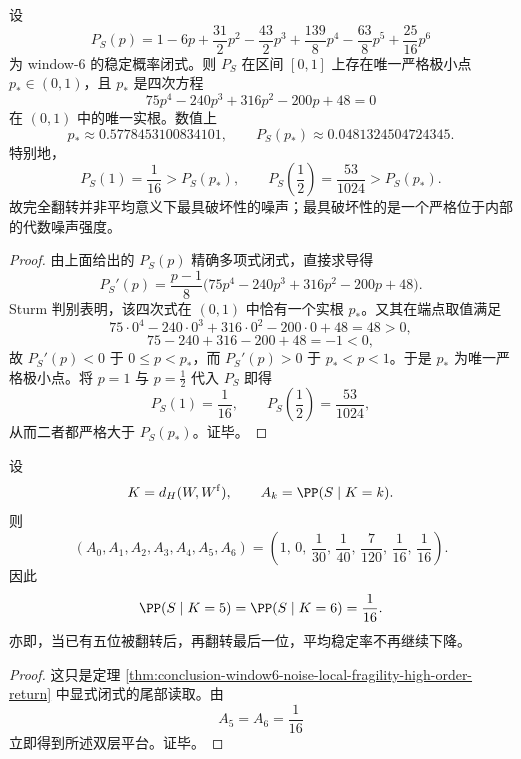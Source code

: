 \begin{theorem}\label{thm:conclusion-window6-stability-probability-unique-internal-minimum}
设
\[
P_S(p)=1-6p+\frac{31}{2}p^2-\frac{43}{2}p^3+\frac{139}{8}p^4-\frac{63}{8}p^5+\frac{25}{16}p^6
\]
为 window-\(6\) 的稳定概率闭式。则 \(P_S\) 在区间 \([0,1]\) 上存在唯一严格极小点 \(p_*\in(0,1)\)，且 \(p_*\) 是四次方程
\[
75p^4-240p^3+316p^2-200p+48=0
\]
在 \((0,1)\) 中的唯一实根。数值上
\[
p_*\approx 0.5778453100834101,
\qquad
P_S(p_*)\approx 0.0481324504724345.
\]
特别地，
\[
P_S(1)=\frac1{16}>P_S(p_*),
\qquad
P_S\!\left(\frac12\right)=\frac{53}{1024}>P_S(p_*).
\]
故完全翻转并非平均意义下最具破坏性的噪声；最具破坏性的是一个严格位于内部的代数噪声强度。
\end{theorem}
\begin{proof}
由上面给出的 \(P_S(p)\) 精确多项式闭式，直接求导得
\[
P_S'(p)
=
\frac{p-1}{8}\bigl(75p^4-240p^3+316p^2-200p+48\bigr).
\]
Sturm 判别表明，该四次式在 \((0,1)\) 中恰有一个实根 \(p_*\)。又其在端点取值满足
\[
75\cdot 0^4-240\cdot 0^3+316\cdot 0^2-200\cdot 0+48=48>0,
\]
\[
75-240+316-200+48=-1<0,
\]
故 \(P_S'(p)<0\) 于 \(0\le p<p_*\)，而 \(P_S'(p)>0\) 于 \(p_*<p<1\)。于是 \(p_*\) 为唯一严格极小点。将 \(p=1\) 与 \(p=\frac12\) 代入 \(P_S\) 即得
\[
P_S(1)=\frac1{16},
\qquad
P_S\!\left(\frac12\right)=\frac{53}{1024},
\]
从而二者都严格大于 \(P_S(p_*)\)。证毕。
\end{proof}

\begin{corollary}\label{cor:conclusion-window6-hamming-tail-twolevel-platform}
设
\[
K=d_H(W,W^{\mathrm f}),
\qquad
A_k=\PP(S\mid K=k).
\]
则
\[
(A_0,A_1,A_2,A_3,A_4,A_5,A_6)
=
\left(
1,\,
0,\,
\frac1{30},\,
\frac1{40},\,
\frac7{120},\,
\frac1{16},\,
\frac1{16}
\right).
\]
因此
\[
\PP(S\mid K=5)=\PP(S\mid K=6)=\frac1{16}.
\]
亦即，当已有五位被翻转后，再翻转最后一位，平均稳定率不再继续下降。
\end{corollary}
\begin{proof}
这只是定理 \ref{thm:conclusion-window6-noise-local-fragility-high-order-return} 中显式闭式的尾部读取。由
\[
A_5=A_6=\frac1{16}
\]
立即得到所述双层平台。证毕。
\end{proof}

